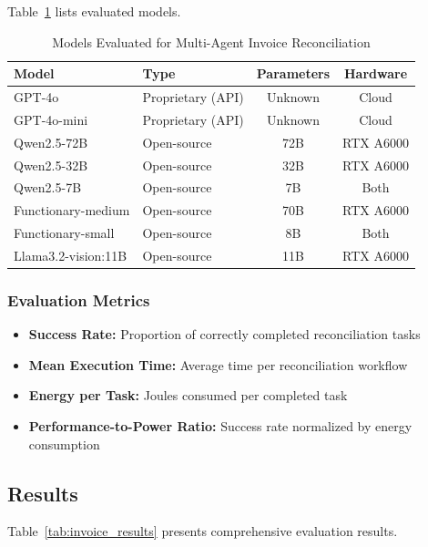 Table~\ref{tab:agentic_models} lists evaluated models.

\begin{table}[htbp]
\centering
\caption{Models Evaluated for Multi-Agent Invoice Reconciliation}
\label{tab:agentic_models}
\begin{tabular}{@{}llcc@{}}
\toprule
\textbf{Model} & \textbf{Type} & \textbf{Parameters} & \textbf{Hardware} \\
\midrule
GPT-4o & Proprietary (API) & Unknown & Cloud \\
GPT-4o-mini & Proprietary (API) & Unknown & Cloud \\
Qwen2.5-72B & Open-source & 72B & RTX A6000 \\
Qwen2.5-32B & Open-source & 32B & RTX A6000 \\
Qwen2.5-7B & Open-source & 7B & Both \\
Functionary-medium & Open-source & 70B & RTX A6000 \\
Functionary-small & Open-source & 8B & Both \\
Llama3.2-vision:11B & Open-source & 11B & RTX A6000 \\
\bottomrule
\end{tabular}
\end{table}

\subsubsection{Evaluation Metrics}

\begin{itemize}[leftmargin=*]
    \item \textbf{Success Rate:} Proportion of correctly completed reconciliation tasks
    \item \textbf{Mean Execution Time:} Average time per reconciliation workflow
    \item \textbf{Energy per Task:} Joules consumed per completed task
    \item \textbf{Performance-to-Power Ratio:} Success rate normalized by energy consumption
\end{itemize}

\subsection{Results}

Table~\ref{tab:invoice_results} presents comprehensive evaluation results.

